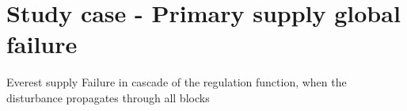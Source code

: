 \section{Study case - Primary supply global failure}

Everest supply
Failure in cascade of the regulation function, when the disturbance propagates through all blocks
